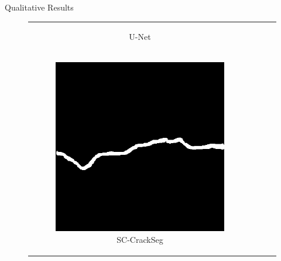 \documentclass{lib/curtin_format}
\begin{document}
\begin{frame}{Qualitative Results}
\begin{figure}[htbp]
\begin{tabular}{cccc}
\begin{subfigure}[b]{0.23\textwidth}
                \caption{U-Net}
                \label{fig:crackseg-experiment-qualitative-unet}
            \end{subfigure}
            \\
            \begin{subfigure}[b]{0.23\textwidth}
                \centering
                \includegraphics[width=\textwidth]{res/crackseg-experiment-qualitative/sc-crackseg.png}
                \caption{SC-CrackSeg}
                \label{fig:crackseg-experiment-qualitative-sc-crackseg}
            \end{subfigure}
            \begin{subfigure}[b]{0.23\textwidth}
                \centering

\end{subfigure}
\end{tabular}
\end{figure}
\end{frame}
\end{document}
